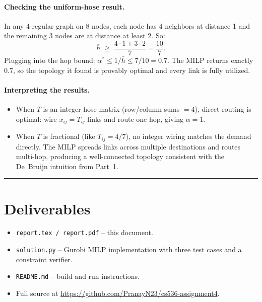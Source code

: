 \documentclass[11pt]{article}
\begin{document}
\paragraph{Checking the uniform-hose result.}
In any 4-regular graph on 8 nodes, each node has 4 neighbors at distance 1
and the remaining 3 nodes are at distance at least 2. So:
\[
\bar{h} \;\ge\; \frac{4 \cdot 1 + 3 \cdot 2}{7} = \frac{10}{7}.
\]
Plugging into the hop bound: $\alpha^* \le 1/\bar{h} \le 7/10 = 0.7$.
The MILP returns exactly $0.7$, so the topology it found is provably
optimal and every link is fully utilized.

\paragraph{Interpreting the results.}
\begin{itemize}[leftmargin=*]
\item When $T$ is an integer hose matrix (row/column sums $= 4$), direct
  routing is optimal: wire $x_{ij} = T_{ij}$ links and route one hop,
  giving $\alpha = 1$.
\item When $T$ is fractional (like $T_{ij}=4/7$), no integer wiring
  matches the demand directly. The MILP spreads links across multiple
  destinations and routes multi-hop, producing a well-connected topology
  consistent with the De~Bruijn intuition from Part~1.
\end{itemize}

\bigskip\hrule\bigskip

\section*{Deliverables}

\begin{itemize}[leftmargin=*,nosep]
\item \texttt{report.tex / report.pdf} -- this document.
\item \texttt{solution.py} -- Gurobi MILP implementation with three test
  cases and a constraint verifier.
\item \texttt{README.md} -- build and run instructions.
\item Full source at \url{https://github.com/PranayN23/cs536-assignment4}.
\end{itemize}
\end{document}
